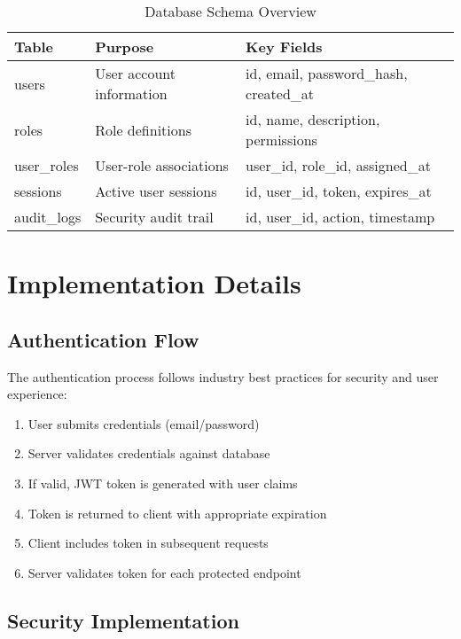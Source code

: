 \documentclass[12pt,a4paper]{article}
\begin{document}
\begin{table}[H]
    \centering
    \begin{tabular}{|l|l|l|}
        \hline
        \textbf{Table} & \textbf{Purpose} & \textbf{Key Fields} \\
        \hline
        users & User account information & id, email, password\_hash, created\_at \\
        \hline
        roles & Role definitions & id, name, description, permissions \\
        \hline
        user\_roles & User-role associations & user\_id, role\_id, assigned\_at \\
        \hline
        sessions & Active user sessions & id, user\_id, token, expires\_at \\
        \hline
        audit\_logs & Security audit trail & id, user\_id, action, timestamp \\
        \hline
    \end{tabular}
    \caption{Database Schema Overview}
    \label{tab:database}
\end{table}

\section{Implementation Details}

\subsection{Authentication Flow}

The authentication process follows industry best practices for security and user experience:

\begin{enumerate}
    \item User submits credentials (email/password)
    \item Server validates credentials against database
    \item If valid, JWT token is generated with user claims
    \item Token is returned to client with appropriate expiration
    \item Client includes token in subsequent requests
    \item Server validates token for each protected endpoint
\end{enumerate}

\subsection{Security Implementation}
\end{document}
